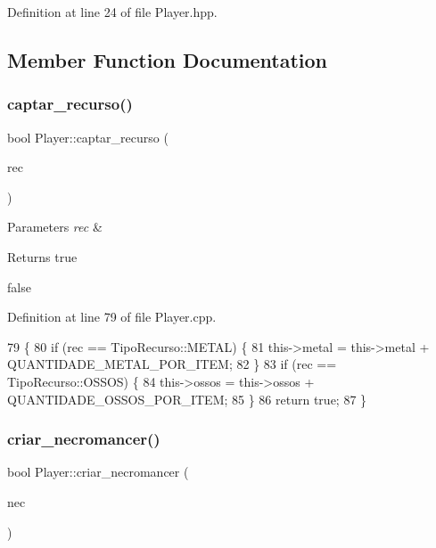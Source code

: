 Definition at line 24 of file Player.\+hpp.



\subsection{Member Function Documentation}
\mbox{\label{class_player_a66d2bc18dfc9b913109761a95126f086}} 
\subsubsection{\texorpdfstring{captar\+\_\+recurso()}{captar\_recurso()}}
{\footnotesize\ttfamily bool Player\+::captar\+\_\+recurso (\begin{DoxyParamCaption}\item[{Tipo\+Recurso}]{rec }\end{DoxyParamCaption})}


\begin{DoxyParams}{Parameters}
{\em rec} & \\
\hline
\end{DoxyParams}
\begin{DoxyReturn}{Returns}
true 

false 
\end{DoxyReturn}


Definition at line 79 of file Player.\+cpp.


\begin{DoxyCode}
79                                            \{
80     \textcolor{keywordflow}{if} (rec == TipoRecurso::METAL) \{
81         this->metal = this->metal + QUANTIDADE\_METAL\_POR\_ITEM;
82     \}
83     \textcolor{keywordflow}{if} (rec == TipoRecurso::OSSOS) \{
84         this->ossos = this->ossos + QUANTIDADE\_OSSOS\_POR\_ITEM;
85     \}
86     \textcolor{keywordflow}{return} \textcolor{keyword}{true};
87 \}
\end{DoxyCode}
\mbox{\label{class_player_a118c76695a9c1f362a5371381bfe5be3}} 
\subsubsection{\texorpdfstring{criar\+\_\+necromancer()}{criar\_necromancer()}}
{\footnotesize\ttfamily bool Player\+::criar\+\_\+necromancer (\begin{DoxyParamCaption}\item[{Tipo\+Necromancer}]{nec }\end{DoxyParamCaption})}


